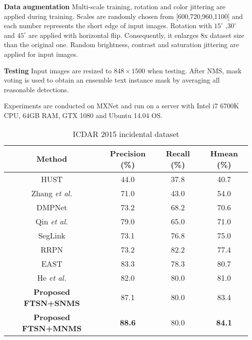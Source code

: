 \documentclass[a4paper,conference]{IEEEtran}
\begin{document}
\textbf{Data augmentation} Multi-scale training, rotation and color jittering are applied during training. Scales are randomly chosen from [600,720,960,1100] and each number represents the short edge of input images. Rotation with $15^{\circ}$ ,$30^{\circ}$  and $45^{\circ}$  are applied with horizontal flip. Consequently, it enlarges 8x dataset size than the original one. Random brightness, contrast and saturation jittering are applied for input images.

\textbf{Testing} Input images are resized to \begin{math}848\times1500\end{math} when testing. After NMS, mask voting\cite{dai2016instance} is used to obtain an ensemble text instance mask by averaging all reasonable detections. 

Experiments are conducted on MXNet\cite{chen2015mxnet} and run on a server with Intel i7 6700K CPU, 64GB RAM, GTX 1080 and Ubuntu 14.04 OS.
\begin{table}[htbp]
 \caption{\label{tab:1} ICDAR 2015 incidental dataset}
 \begin{center}
\begin{tabular}
{c||c|c|c}
Method & Precision (\%) & Recall (\%) & Hmean (\%) \\
\hline\hline
 HUST\cite{Karatzas2015ICDAR} & 44.0 & 37.8 & 40.7 \\
 Zhang \emph{et al.}\cite{zhang2016multi_oriented} & 71.0 & 43.0 & 54.0\\
 DMPNet\cite{Liu2017deep} & 73.2 & 68.2 & 70.6 \\
Qin \emph{et al.}\cite{Qin2017Cascaded} & 79.0 & 65.0 & 71.0 \\
SegLink\cite{Shi2017Detecting}  & 73.1 & 76.8 & 75.0 \\
RRPN\cite{Ma2017arbitrary} & 73.2 & 82.2 & 77.4 \\
EAST\cite{Zhou2017EAST} & 83.3 & 78.3 & 80.7 \\
He \emph{et al.}\cite{He2017deep_direct} & 82.0 & 80.0 & 81.0\\
\hline\hline
\textbf{Proposed FTSN+SNMS} & 87.1 & 80.0 & 83.4 \\
\textbf{Proposed FTSN+MNMS} & \textbf{88.6} & 80.0 & \textbf{84.1} \\
\hline
 \end{tabular}
 \end{center}
\end{table}
\end{document}
